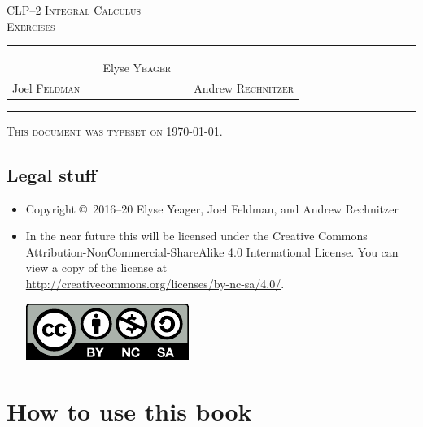 \documentclass[12pt,letterpaper, openany]{book}
\begin{document}
\setcounter{page}{0}


\begin{titlepage}
\begin{center}
\textsc{\LARGE
CLP--2 Integral Calculus \\[2ex]
Exercises
}\\[2ex]

\vspace{5ex}
\hrule
\vspace{5ex}

\begin{tabular}{lcccr}
&& \large Elyse \textsc{Yeager} \\[3ex]
 Joel \textsc{Feldman}
&\quad & &\quad&
Andrew \textsc{Rechnitzer}
\end{tabular}

\end{center}
\vspace{2ex}
\hrule

\vfill
\textsc{This document was typeset on \today.}
\end{titlepage}

\section*{Legal stuff}
\begin{itemize}
 \item Copyright \copyright\ 2016--20 Elyse Yeager,  Joel Feldman,
and Andrew  Rechnitzer

\item In the near future this will be licensed under the
Creative Commons Attribution-NonCommercial-ShareAlike 4.0 International
License. You can view a copy of the license at \\
\url{http://creativecommons.org/licenses/by-nc-sa/4.0/}.
\begin{center}
 \includegraphics{figures/by-nc-sa.pdf}
\end{center}
\end{itemize}

\newpage

\frontmatter

\chapter{How to use this book}

\end{document}
